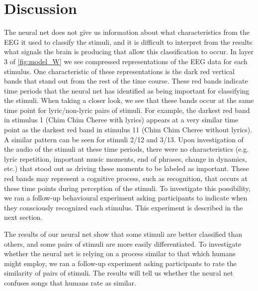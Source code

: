 \section{Discussion}
The neural net does not give us information about what characteristics from the EEG it used to classify the stimuli, and it is difficult to interpret from the results what signals the brain is producing that allow this classification to occur. 
In layer 3 of \autoref{fig:model_W} we see compressed representations of the EEG data for each stimulus. 
One characteristic of these representations is the dark red vertical bands that stand out from the rest of the time course. 
These red bands indicate time periods that the neural net has identified as being important for classifying the stimuli.
When taking a closer look, we see that these bands occur at the same time point for lyric/non-lyric pairs of stimuli. 
For example, the darkest red band in stimulus 1 (Chim Chim Cheree with lyrics) appears at a very similar time point as the darkest red band in stimulus 11 (Chim Chim Cheree without lyrics).
A similar pattern can be seen for stimuli 2/12 and 3/13.
Upon investigation of the audio of the stimuli at these time periods, there were no characteristics (e.g. lyric repetition, important music moments, end of phrases, change in dynamics, etc.) that stood out as driving these moments to be labeled as important.
These red bands may represent a cognitive process, such as recognition, that occurs at these time points during perception of the stimuli. 
To investigate this possibility, we ran a follow-up behavioural experiment asking participants to indicate when they consciously recognized each stimulus. 
This experiment is described in the next section.

The results of our neural net show that some stimuli are better classified than others, and some pairs of stimuli are more easily differentiated. 
To investigate whether the neural net is relying on a process similar to that which humans might employ, we ran a follow-up experiment asking participants to rate the similarity of pairs of stimuli. 
The results will tell us whether the neural net confuses songs that humans rate as similar. 